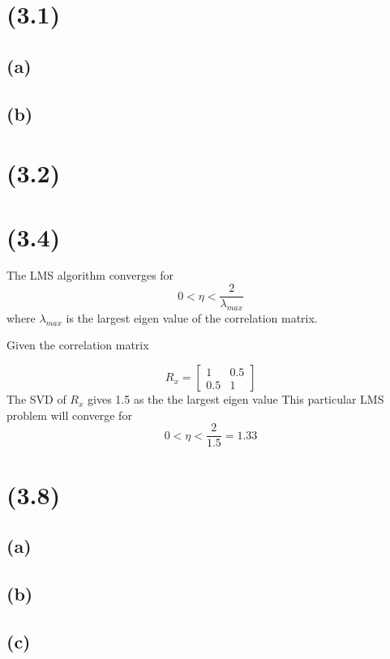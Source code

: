 \documentclass[paper=a4, fontsize=11pt]{scrartcl} %
\begin{document}
\section{ (3.1) }
    
\subsection{ (a) }

\subsection{ (b) }

\section{ (3.2) }
\section{ (3.4) }
The LMS algorithm converges for 
$$0 < \eta < \frac{2}{\lambda_{max}} $$ 
where $\lambda_{max}$ is the largest eigen value of the correlation matrix.

Given the correlation matrix

$$
R_x =  
\left[ 
\begin{array}{cc}
1 & 0.5 \\ 
0.5 & 1 
\end{array} 
\right]
$$
The SVD of $R_x$ gives 1.5 as the the largest eigen value
This particular LMS problem will converge for 
$$ 0 < \eta <  \frac{2}{1.5} = 1.33 $$
\section{ (3.8) }
\subsection{ (a) }
\subsection{ (b) }
\subsection{ (c) }
\end{document}
